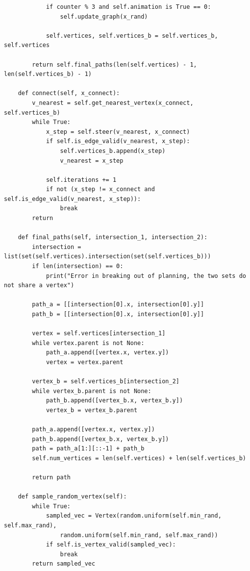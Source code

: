\documentclass{article}
\begin{document}
\begin{verbatim}
            if counter % 3 and self.animation is True == 0:
                self.update_graph(x_rand)

            self.vertices, self.vertices_b = self.vertices_b, self.vertices

        return self.final_paths(len(self.vertices) - 1, len(self.vertices_b) - 1)

    def connect(self, x_connect):
        v_nearest = self.get_nearest_vertex(x_connect, self.vertices_b)
        while True:
            x_step = self.steer(v_nearest, x_connect)
            if self.is_edge_valid(v_nearest, x_step):
                self.vertices_b.append(x_step)
                v_nearest = x_step

            self.iterations += 1
            if not (x_step != x_connect and self.is_edge_valid(v_nearest, x_step)):
                break
        return

    def final_paths(self, intersection_1, intersection_2):
        intersection = list(set(self.vertices).intersection(set(self.vertices_b)))
        if len(intersection) == 0:
            print("Error in breaking out of planning, the two sets do not share a vertex")

        path_a = [[intersection[0].x, intersection[0].y]]
        path_b = [[intersection[0].x, intersection[0].y]]

        vertex = self.vertices[intersection_1]
        while vertex.parent is not None:
            path_a.append([vertex.x, vertex.y])
            vertex = vertex.parent

        vertex_b = self.vertices_b[intersection_2]
        while vertex_b.parent is not None:
            path_b.append([vertex_b.x, vertex_b.y])
            vertex_b = vertex_b.parent

        path_a.append([vertex.x, vertex.y])
        path_b.append([vertex_b.x, vertex_b.y])
        path = path_a[1:][::-1] + path_b 
        self.num_vertices = len(self.vertices) + len(self.vertices_b)

        return path

    def sample_random_vertex(self):
        while True:
            sampled_vec = Vertex(random.uniform(self.min_rand, self.max_rand),
                random.uniform(self.min_rand, self.max_rand))
            if self.is_vertex_valid(sampled_vec):
                break
        return sampled_vec

\end{verbatim}
\end{document}
